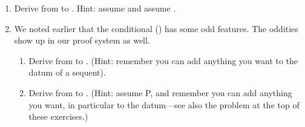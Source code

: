 \begin{enumerate}
{{}
}

\item Derive from  to . Hint: assume 
  and assume .

 \opts{

\dotline
\dotline
\dotline
\dotline
\dotline
\dotline
\dotline
\dotline
\dotline
 }
 {
}

\item We noted earlier that the conditional (\p{\limplies}) has some odd 
 features. The oddities show up in our proof system as well.

 \begin{enumerate}

  \item Derive from  to . (Hint: 
   remember you can add anything you want to the datum of a sequent).
\opts{
 
 \dotline
 \dotline
 \dotline
 \dotline
 \dotline
 \dotline

}
{   
}
\item Derive from  to .  
 (Hint: assume P, and remember you can add anything you want, in particular 
  to the datum---see also the problem at the top of these exercises.)
\opts{


}
\end{enumerate}
\end{enumerate}
